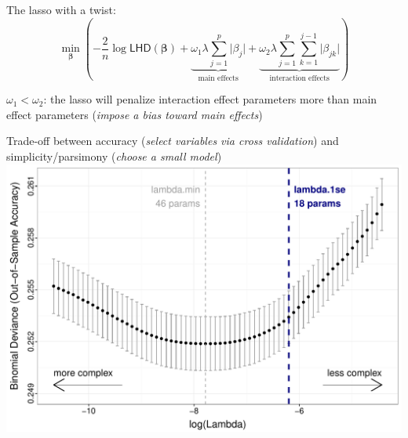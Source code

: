 \documentclass[11pt,xcolor=svgnames]{beamer}
\newcommand{\fg}{\color{ForestGreen}}
\newcommand{\bm}[1]{\mathbf{#1}}
\begin{document}
\begin{frame}

The lasso with a twist:
\[ \min_{\bm{\beta}} \left(-\frac{2}{n}\log{\textsf{LHD}(\bm{\beta})} + \underbrace{\omega_1 \lambda \sum_{j=1}^{p} \vert \beta_j \vert}_{\text{main effects}} + \underbrace{\omega_2 \lambda \sum_{j=1}^p \sum_{k=1}^{j-1} \vert \beta_{jk} \vert}_{\text{interaction effects}} \right) \]

\vskip 0.5cm 
$\omega_1 < \omega_2$: the lasso will penalize interaction effect parameters more than main effect parameters (\textit{\fg impose a bias toward main effects})

\end{frame}


\begin{frame}
Trade-off between accuracy (\textit{\fg select variables via cross validation}) and simplicity/parsimony (\textit{\fg choose a small model})
\includegraphics[width=\textwidth]{regpath2.pdf}
\end{frame}
\end{document}
